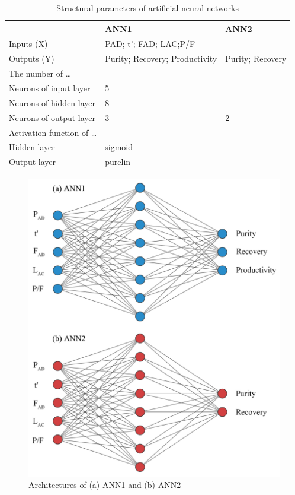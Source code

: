 \documentclass[preprint,12pt]{elsarticle}
\begin{document}
\begin{table}[]
	\centering
	\caption{Structural parameters of artificial neural networks}
	\begin{tabular}{lll}
		\toprule
		& ANN1                             & ANN2               \\
		\midrule
		Inputs   (X)              & \multicolumn{2}{l}{PAD;   t'; FAD; LAC;P/F}           \\
		Outputs   (Y)             & Purity;   Recovery; Productivity & Purity;   Recovery \\
		The number of …           & \multicolumn{2}{l}{}                                  \\
		Neurons   of input layer  & \multicolumn{2}{l}{5}                                 \\
		Neurons   of hidden layer & \multicolumn{2}{l}{8}                                 \\
		Neurons   of output layer & 3                                & 2                  \\
		Activation function of …  & \multicolumn{2}{l}{}                                  \\
		Hidden   layer            & \multicolumn{2}{l}{sigmoid}                           \\
		Output   layer            & \multicolumn{2}{l}{purelin}                          \\
		\bottomrule
	\end{tabular}
\label{TABLE:4}
\end{table}
\begin{figure}
	\centering
	\includegraphics[width=1\textwidth]{figs/Fig6.pdf}
	\caption{Architectures of (a) ANN1 and (b) ANN2}
	\label{FIG:6}
\end{figure}
\end{document}
